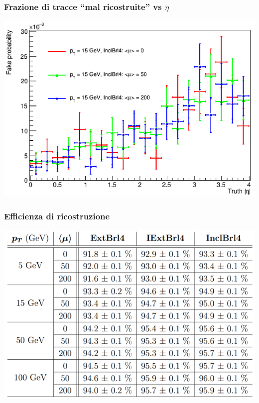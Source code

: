\documentclass{beamer}
\begin{document}
\begin{frame}
\frametitle{Frazione di tracce ``mal ricostruite'' vs $\eta$}
\centering
\includegraphics[width=.9\textwidth]{fakeProb_abseta}
\end{frame}

\begin{frame}
\frametitle{Efficienza di ricostruzione}
\includegraphics[width=.9\textwidth]{eff_tab}
\end{frame}
\end{document}

